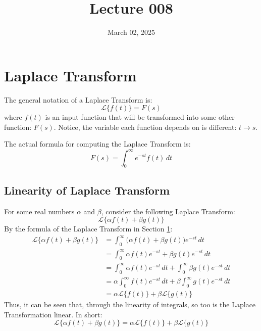 \documentclass[12pt]{article}
\title{Lecture 008}
\date{March 02, 2025}
\begin{document}
\newpage

\section{Laplace Transform}
\label{sec:laplaceTransform}

The general notation of a Laplace Transform is:
\begin{equation*}
  \mathcal{L}\big\{f(t)\big\} = F(s)
\end{equation*}
where $f(t)$ is an input function that will be transformed into some other function: $F(s)$. Notice, the variable each function depends on is different: $t \rightarrow s$.

The actual formula for computing the Laplace Transform is:
\begin{equation*}
  F(s) = \int_{0}^{\infty} e^{-st}f(t) \,dt
\end{equation*}

\subsection{Linearity of Laplace Transform}
\label{ssec:linearityOfLaplaceTransform}

For some real numbers $\alpha$ and $\beta$, consider the following Laplace Transform:
\begin{equation*}
  \mathcal{L}\big\{\alpha f(t) + \beta g(t)\big\}
\end{equation*}
By the formula of the Laplace Transform in Section \ref{sec:laplaceTransform}:
\begin{align*}
  \mathcal{L}\big\{\alpha f(t) + \beta g(t)\big\} &= \int_{0}^{\infty} \big( \alpha f(t) + \beta g(t) \big)e^{-st} \,dt \\
                                                  &= \int_{0}^{\infty} \alpha f(t) e^{-st} + \beta g(t) e^{-st} \, dt \\
                                                  &= \int_{0}^{\infty} \alpha f(t) e^{-st} \, dt + \int_{0}^{\infty} \beta g(t) e^{-st} \, dt \\
                                                  &= \alpha \int_{0}^{\infty} f(t) e^{-st} \, dt + \beta \int_{0}^{\infty} g(t) e^{-st} \, dt \\
                                                  &= \alpha \mathcal{L}\big\{ f(t) \big\} + \beta \mathcal{L}\big\{ g(t) \big\}
\end{align*}
Thus, it can be seen that, through the linearity of integrals, so too is the Laplace Transformation linear. In short:
\begin{equation*}
  \mathcal{L}\big\{\alpha f(t) + \beta g(t)\big\} = \alpha \mathcal{L}\big\{ f(t) \big\} + \beta \mathcal{L}\big\{ g(t) \big\}
\end{equation*}
\end{document}
